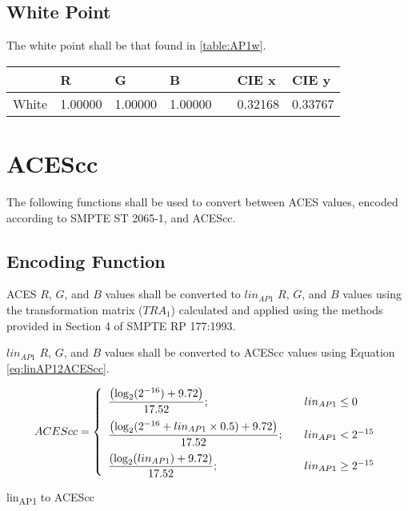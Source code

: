 \subsection{White Point}
The white point shall be that found in \autoref{table:AP1w}.

\begin{center}
\begin{tabularx}{4.5in}{XlllXll}
        & R       & G       & B       & & CIE x & CIE y \\ \hline
White   & 1.00000 & 1.00000 & 1.00000 & & 0.32168 & 0.33767 \\
\end{tabularx}
\label{table:AP1w}
\end{center}

\newpage
\section{ACEScc}
\label{sec:ACEScc}
The following functions shall be used to convert between ACES values, encoded according to SMPTE ST 2065-1, and ACEScc.

\subsection{Encoding Function}
ACES $R$, $G$, and $B$ values shall be converted to $lin_{AP1}$ $R$, $G$, and $B$ values using the transformation matrix ($TRA_{1}$) calculated and applied using the methods provided in Section 4 of SMPTE RP 177:1993.

$lin_{AP1}$ $R$, $G$, and $B$ values shall be converted to ACEScc values using Equation \ref{eq:linAP12ACEScc}.

\begin{floatequ} 
\begin{equation} 
    ACEScc = \left\{ 
    \begin{array}{l l }
        \dfrac{\left(\log_{2}(2^{-16}) + 9.72\right)}{17.52};    & \quad lin_{AP1} \leq 0 \\[10pt]
        \dfrac{\left(\log_{2}(2^{-16} + lin_{AP1} \times 0.5) + 9.72\right)}{17.52};        & \quad lin_{AP1} < 2^{-15} \\[10pt]
        \dfrac{\left(\log_{2}(lin_{AP1}) + 9.72\right)}{17.52}; & \quad lin_{AP1} \geq 2^{-15} \\    
    \end{array} \right.
\end{equation}
\caption{lin\textsubscript{AP1} to ACEScc}
\label{eq:linAP12ACEScc}
\end{floatequ}

